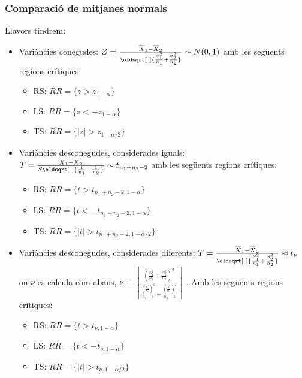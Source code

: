 \documentclass[a4paper]{sciposter}
\renewcommand*{\sqrt}[2][\ ]{\oldsqrt[#1]{#2} }
\begin{document}
\begin{multicols}{3}
\subsubsection{Comparació de mitjanes normals}
Llavors tindrem:
\begin{itemize}
	\item Variàncies conegudes: $Z = \frac{\overline{X}_1 - \overline{X}_2}{\sqrt{\frac{\sigma^2_1}{n_1} + \frac{\sigma^2_2}{n_2}}} \sim N(0,1)$ amb les següents regions crítiques:
	\begin{itemize}
		\item RS: $RR = \{z > z_{1-\alpha}\}$
		\item LS: $RR = \{z < -z_{1-\alpha}\}$
		\item TS: $RR = \{|z| > z_{1-\alpha/2}\}$
	\end{itemize}
	\item Variàncies desconegudes, considerades iguals: $T = \frac{\overline{X}_1 - \overline{X}_2}{S\sqrt{\frac{1}{n_1} + \frac{1}{n_2}}} \sim t_{n_1+n_2-2}$ amb les següents regions crítiques:
	\begin{itemize}
		\item RS: $RR = \{t > t_{n_1+n_2-2,1-\alpha}\}$
		\item LS: $RR = \{t < -t_{n_1+n_2-2,1-\alpha}\}$
		\item TS: $RR = \{|t| > t_{n_1+n_2-2,1-\alpha/2}\}$
	\end{itemize}
	\item Variàncies desconegudes, considerades diferents: $T = \frac{\overline{X}_1 - \overline{X}_2}{\sqrt{\frac{S_1^2}{n_1} + \frac{S_2^2}{n_2}}} \approx t_\nu$ on $\nu$ es calcula com abans, $\nu = \left\lceil\frac{\left(\frac{S^2_1}{n_1}+\frac{S_2^2}{n_2}\right)^2}{\frac{\left(\frac{S^2_1}{n_1}\right)^2}{n_1-1}+\frac{\left(\frac{S^2_2}{n_2}\right)^2}{n_2-1}}\right\rceil$ %
	. Amb les següents regions crítiques:
	\begin{itemize}
		\item RS: $RR = \{t > t_{\nu,1-\alpha}\}$
		\item LS: $RR = \{t < -t_{\nu,1-\alpha}\}$
		\item TS: $RR = \{|t| > t_{\nu,1-\alpha/2}\}$
	\end{itemize}
\end{itemize}

\end{multicols}
\end{document}
